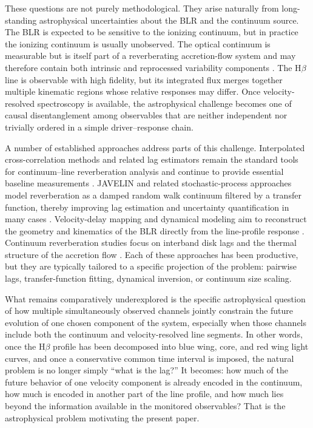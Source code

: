 \documentclass[12pt, a4paper]{article}
\begin{document}
These questions are not purely methodological. They arise naturally from long-standing astrophysical uncertainties about the BLR and the continuum source. The BLR is expected to be sensitive to the ionizing continuum, but in practice the ionizing continuum is usually unobserved. The optical continuum is measurable but is itself part of a reverberating accretion-flow system and may therefore contain both intrinsic and reprocessed variability components \cite{Fausnaugh2017,Cackett2021}. The H$\beta$ line is observable with high fidelity, but its integrated flux merges together multiple kinematic regions whose relative responses may differ. Once velocity-resolved spectroscopy is available, the astrophysical challenge becomes one of causal disentanglement among observables that are neither independent nor trivially ordered in a simple driver--response chain.

A number of established approaches address parts of this challenge. Interpolated cross-correlation methods and related lag estimators remain the standard tools for continuum--line reverberation analysis and continue to provide essential baseline measurements \cite{Peterson2004,WhitePeterson1994}. JAVELIN and related stochastic-process approaches model reverberation as a damped random walk continuum filtered by a transfer function, thereby improving lag estimation and uncertainty quantification in many cases \cite{Zu2011,Zu2013}. Velocity-delay mapping and dynamical modeling aim to reconstruct the geometry and kinematics of the BLR directly from the line-profile response \cite{Pancoast2014,Horne2021}. Continuum reverberation studies focus on interband disk lags and the thermal structure of the accretion flow \cite{Fausnaugh2016,Fausnaugh2017,Edelson2019}. Each of these approaches has been productive, but they are typically tailored to a specific projection of the problem: pairwise lags, transfer-function fitting, dynamical inversion, or continuum size scaling.

What remains comparatively underexplored is the specific astrophysical question of how multiple simultaneously observed channels jointly constrain the future evolution of one chosen component of the system, especially when those channels include both the continuum and velocity-resolved line segments. In other words, once the H$\beta$ profile has been decomposed into blue wing, core, and red wing light curves, and once a conservative common time interval is imposed, the natural problem is no longer simply ``what is the lag?'' It becomes: how much of the future behavior of one velocity component is already encoded in the continuum, how much is encoded in another part of the line profile, and how much lies beyond the information available in the monitored observables? That is the astrophysical problem motivating the present paper.
\end{document}
